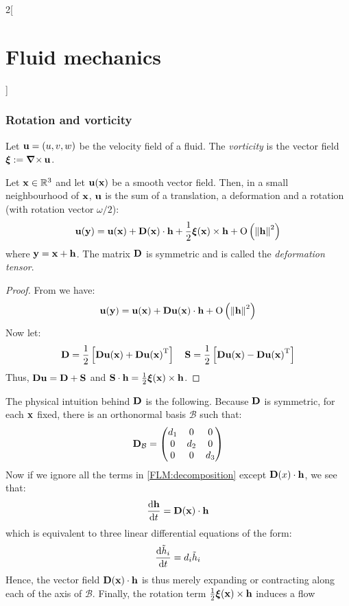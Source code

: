 \documentclass[../../../main_physics.tex]{subfiles}
\begin{document}
\begin{multicols}{2}[\section{Fluid mechanics}]
  \subsubsection{Rotation and vorticity}
  \begin{definition}
    Let $\vf{u}=(u,v,w)$ be the velocity field of a fluid. The \emph{vorticity} is the vector field $\vf{\xi}:=\rotp\vf{u}$.
  \end{definition}
  \begin{proposition}
    Let $\vf{x}\in \RR^3$ and let $\vf{u}(\vf{x})$ be a smooth vector field. Then, in a small neighbourhood of $\vf{x}$, $\vf{u}$ is the sum of a translation, a deformation and a rotation (with rotation vector $\omega/2$):
    \begin{equation}\label{FLM:decomposition}
      \vf{u}(\vf{y})=\vf{u}(\vf{x})+\vf{D}(\vf{x})\cdot \vf{h}+\frac{1}{2} \vf{\xi}(\vf{x})\times \vf{h} +\O{\norm{\vf{h}}^2}
    \end{equation}
    where $\vf{y}=\vf{x}+\vf{h}$. The matrix $\vf{D}$ is symmetric and is called the \emph{deformation tensor}.
  \end{proposition}
  \begin{proof}
    From  we have:
    $$
      \vf{u}(\vf{y})=\vf{u}(\vf{x})+\vf{Du}(\vf{x})\cdot \vf{h}+\O{\norm{\vf{h}}^2}
    $$
    Now let:
    $$
      \vf{D}=\frac{1}{2}\left[\vf{Du}(\vf{x})+\transpose{\vf{Du}(\vf{x})}\right]\quad \vf{S}=\frac{1}{2}\left[\vf{Du}(\vf{x})-\transpose{\vf{Du}(\vf{x})}\right]
    $$
    Thus, $\vf{Du} = \vf{D}+\vf{S}$ and $\vf{S}\cdot\vf{h} = \frac{1}{2} \vf{\xi}(\vf{x})\times \vf{h}$.
  \end{proof}
  \begin{remark}
    The physical intuition behind $\vf{D}$ is the following. Because $\vf{D}$ is symmetric, for each $\vf{x}$ fixed, there is an orthonormal basis $\mathcal{B}$ such that:
    $$
      \vf{D}_{\mathcal{B}}=\begin{pmatrix}
        d_1 & 0   & 0   \\
        0   & d_2 & 0   \\
        0   & 0   & d_3
      \end{pmatrix}
    $$
    Now if we ignore all the terms in \eqref{FLM:decomposition} except $\vf{D}(x)\cdot \vf{h}$, we see that:
    $$
      \dv{\vf{h}}{t}=\vf{D}(\vf{x})\cdot \vf{h}
    $$
    which is equivalent to three linear differential equations of the form:
    $$
      \dv{\tilde{h}_i}{t}=d_i \tilde{h}_i
    $$
    Hence, the vector field $\vf{D}(\vf{x})\cdot \vf{h}$ is thus merely expanding or contracting along each of the axis of $\mathcal{B}$. Finally, the rotation term $\frac{1}{2} \vf{\xi}(\vf{x})\times \vf{h}$ induces a flow

\end{remark}
\end{multicols}
\end{document}
